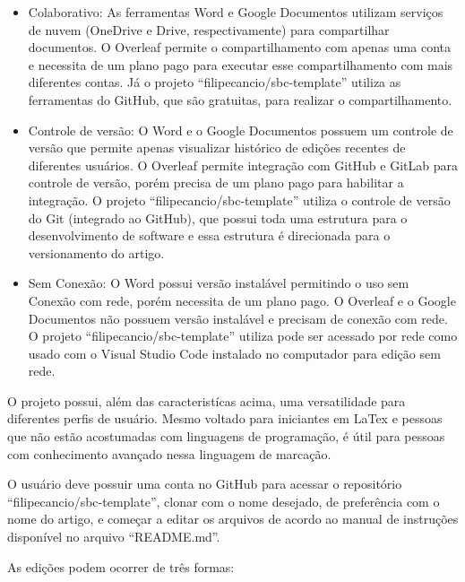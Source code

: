 \begin{itemize}
	\item Colaborativo: As ferramentas Word e Google Documentos utilizam serviços de nuvem (OneDrive e Drive, respectivamente) para compartilhar documentos. O Overleaf permite o compartilhamento com apenas uma conta e necessita de um plano pago para executar esse compartilhamento com mais diferentes contas. Já o projeto ``filipecancio/sbc-template'' utiliza as ferramentas do GitHub, que são gratuitas, para realizar o compartilhamento.
	\item Controle de versão: O Word e o Google Documentos possuem um controle de versão que permite apenas visualizar histórico de edições recentes de diferentes usuários. O Overleaf permite integração com GitHub e GitLab para controle de versão, porém precisa de um plano pago para habilitar a integração. O projeto ``filipecancio/sbc-template'' utiliza o controle de versão do Git (integrado ao GitHub), que possui toda uma estrutura para o desenvolvimento de software e essa estrutura é direcionada para o versionamento do artigo.
	\item Sem Conexão: O Word possui versão instalável permitindo o uso sem Conexão com rede, porém necessita de um plano pago. O Overleaf e o Google Documentos não possuem versão instalável e precisam de conexão com rede. O projeto ``filipecancio/sbc-template'' utiliza pode ser acessado por rede como usado com o Visual Studio Code instalado no computador para edição sem rede.
\end{itemize}

O projeto possui, além das caracteristícas acima, uma versatilidade para diferentes perfis de usuário. Mesmo voltado para iniciantes em LaTex e pessoas que não estão acostumadas com linguagens de programação, é útil para pessoas com conhecimento avançado nessa linguagem de marcação. 

O usuário deve possuir uma conta no GitHub para acessar o repositório ``filipecancio/sbc-template'', clonar com o nome desejado, de preferência com o nome do artigo, e começar a editar os arquivos de acordo ao manual de instruções disponível no arquivo ``README.md''.

As edições podem ocorrer de três formas:


